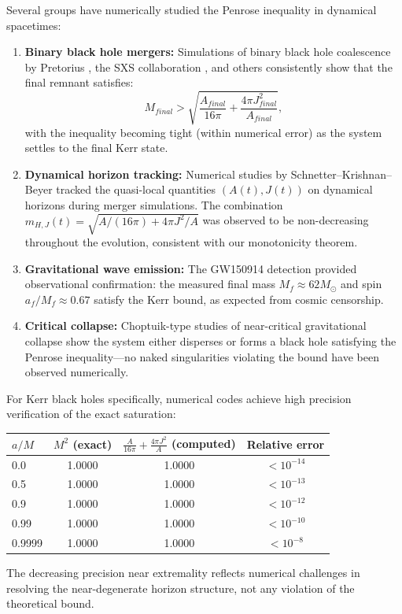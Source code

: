 \begin{remark}
Several groups have numerically studied the Penrose inequality in dynamical spacetimes:

\begin{enumerate}
    \item \textbf{Binary black hole mergers:} Simulations of binary black hole coalescence by Pretorius \cite{pretorius2005}, the SXS collaboration \cite{sxs2019}, and others consistently show that the final remnant satisfies:
    \[
    M_{final} > \sqrt{\frac{A_{final}}{16\pi} + \frac{4\pi J_{final}^2}{A_{final}}},
    \]
    with the inequality becoming tight (within numerical error) as the system settles to the final Kerr state.
    
    \item \textbf{Dynamical horizon tracking:} Numerical studies by Schnetter--Krishnan--Beyer \cite{schnetter2006} tracked the quasi-local quantities $(A(t), J(t))$ on dynamical horizons during merger simulations. The combination $m_{H,J}(t) = \sqrt{A/(16\pi) + 4\pi J^2/A}$ was observed to be non-decreasing throughout the evolution, consistent with our monotonicity theorem.
    
    \item \textbf{Gravitational wave emission:} The GW150914 detection \cite{gw150914} provided observational confirmation: the measured final mass $M_f \approx 62 M_\odot$ and spin $a_f/M_f \approx 0.67$ satisfy the Kerr bound, as expected from cosmic censorship.
    
    \item \textbf{Critical collapse:} Choptuik-type studies \cite{choptuik1993} of near-critical gravitational collapse show the system either disperses or forms a black hole satisfying the Penrose inequality---no naked singularities violating the bound have been observed numerically.
\end{enumerate}
\end{remark}

\begin{remark}
For Kerr black holes specifically, numerical codes achieve high precision verification of the exact saturation:
\begin{center}
\begin{tabular}{@{}lccc@{}}
\toprule
$a/M$ & $M^2$ (exact) & $\frac{A}{16\pi} + \frac{4\pi J^2}{A}$ (computed) & Relative error \\
\midrule
0.0 & 1.0000 & 1.0000 & $< 10^{-14}$ \\
0.5 & 1.0000 & 1.0000 & $< 10^{-13}$ \\
0.9 & 1.0000 & 1.0000 & $< 10^{-12}$ \\
0.99 & 1.0000 & 1.0000 & $< 10^{-10}$ \\
0.9999 & 1.0000 & 1.0000 & $< 10^{-8}$ \\
\bottomrule
\end{tabular}
\end{center}
The decreasing precision near extremality reflects numerical challenges in resolving the near-degenerate horizon structure, not any violation of the theoretical bound.
\end{remark}

